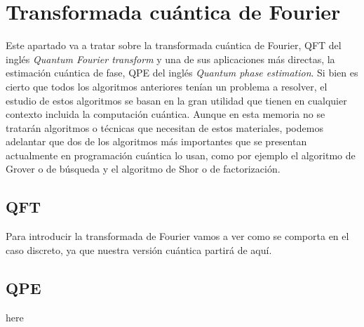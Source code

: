 \section{Transformada cuántica de Fourier}
\label{Sec3.6:Fourier}

Este apartado va a tratar sobre la transformada cuántica de Fourier, QFT del inglés \textit{Quantum Fourier transform} y una de sus aplicaciones más directas, la estimación cuántica de fase, QPE del inglés \textit{Quantum phase estimation}. Si bien es cierto que todos los algoritmos anteriores tenían un problema a resolver, el estudio de estos algoritmos se basan en la gran utilidad que tienen en cualquier contexto incluida la computación cuántica. Aunque en esta memoria no se tratarán algoritmos o técnicas que necesitan de estos materiales, podemos adelantar que dos de los algoritmos más importantes que se presentan actualmente en programación cuántica lo usan, como por ejemplo el algoritmo de Grover o de búsqueda y el algoritmo de Shor o de factorización.

\subsection{QFT}
Para introducir la transformada de Fourier vamos a ver como se comporta en el caso discreto, ya que nuestra versión cuántica partirá de aquí. 

\subsection{QPE}
 here